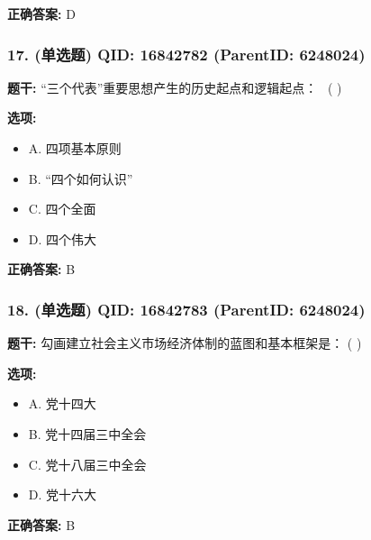 \documentclass[12pt,UTF8]{ctexart}
\begin{document}
\textbf{正确答案:}
D

\vspace{0.3em}\hrulefill\vspace{0.7em}

\subsubsection*{17. (单选题) \small QID: 16842782 (ParentID: 6248024)}

\textbf{题干:}
“三个代表”重要思想产生的历史起点和逻辑起点：  ( )



\textbf{选项:}
\begin{itemize}[leftmargin=*]

  \item A. 四项基本原则

  \item B. “四个如何认识”

  \item C. 四个全面

  \item D. 四个伟大

\end{itemize}

\textbf{正确答案:}
B

\vspace{0.3em}\hrulefill\vspace{0.7em}

\subsubsection*{18. (单选题) \small QID: 16842783 (ParentID: 6248024)}

\textbf{题干:}
勾画建立社会主义市场经济体制的蓝图和基本框架是： ( )



\textbf{选项:}
\begin{itemize}[leftmargin=*]

  \item A. 党十四大

  \item B. 党十四届三中全会

  \item C. 党十八届三中全会

  \item D. 党十六大

\end{itemize}

\textbf{正确答案:}
B
\end{document}

